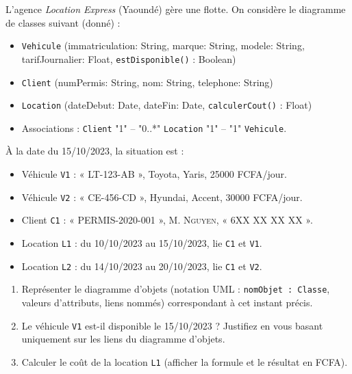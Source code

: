 \documentclass[11pt]{article}
\begin{document}
\begin{exercice}
L'agence \textit{Location Express} (Yaoundé) gère une flotte. On considère le diagramme de classes suivant (donné) :
\begin{itemize}
    \item \texttt{Vehicule} (immatriculation: String, marque: String, modele: String, tarifJournalier: Float, \texttt{estDisponible()} : Boolean)
    \item \texttt{Client} (numPermis: String, nom: String, telephone: String)
    \item \texttt{Location} (dateDebut: Date, dateFin: Date, \texttt{calculerCout()} : Float)
    \item Associations : \texttt{Client} "1" -- "0..*" \texttt{Location} "1" -- "1" \texttt{Vehicule}.
\end{itemize}
À la date du 15/10/2023, la situation est :
\begin{itemize}
    \item Véhicule \texttt{V1} : « LT-123-AB », Toyota, Yaris, 25000 FCFA/jour.
    \item Véhicule \texttt{V2} : « CE-456-CD », Hyundai, Accent, 30000 FCFA/jour.
    \item Client \texttt{C1} : « PERMIS-2020-001 », M. \textsc{Nguyen}, « 6XX XX XX XX ».
    \item Location \texttt{L1} : du 10/10/2023 au 15/10/2023, lie \texttt{C1} et \texttt{V1}.
    \item Location \texttt{L2} : du 14/10/2023 au 20/10/2023, lie \texttt{C1} et \texttt{V2}.
\end{itemize}
\begin{enumerate}
    \item Représenter le diagramme d'objets (notation UML : \texttt{nomObjet : Classe}, valeurs d'attributs, liens nommés) correspondant à cet instant précis.
    \item Le véhicule \texttt{V1} est-il disponible le 15/10/2023 ? Justifiez en vous basant uniquement sur les liens du diagramme d'objets.
    \item Calculer le coût de la location \texttt{L1} (afficher la formule et le résultat en FCFA).
\end{enumerate}
\end{exercice}
\end{document}
